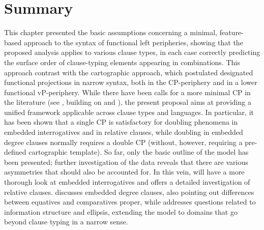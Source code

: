 \section{Summary} \label{sec:2summary}
This chapter presented the basic assumptions concerning a minimal, feature-based approach to the syntax of functional left peripheries, showing that the proposed analysis applies to various clause types, in each case correctly predicting the surface order of clause-typing elements appearing in combinations. This approach contrast with the cartographic approach, which postulated designated functional projections in narrow syntax, both in the CP-periphery and in a lower functional vP-periphery. While there have been calls for a more minimal CP in the literature (see \citealt{sobin2002}, building on \citealt{pesetsky1982} and \citealt{sobin1987}), the present proposal aims at providing a unified framework applicable across clause types and languages. In particular, it has been shown that a single CP is satisfactory for doubling phenomena in embedded interrogatives and in relative clauses, while doubling in embedded degree clauses normally requires a double CP (without, however, requiring a pre-defined cartographic template). So far, only the basic outline of the model has been presented; further investigation of the data reveals that there are various asymmetries that should also be accounted for. In this vein,  will have a more thorough look at embedded interrogatives and  offers a detailed investigation of relative clauses.  discusses embedded degree clauses, also pointing out differences between equatives and comparatives proper, while  addresses questions related to information structure and ellipsis, extending the model to domains that go beyond clause typing in a narrow sense.
